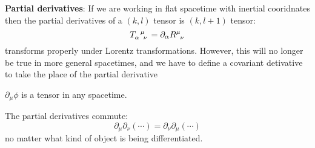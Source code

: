 \textbf{Partial derivatives}: If we are working in flat spacetime with inertial cooridnates then the partial derivatives of a $(k,l)$ tensor is $(k,l+1)$ tensor:
\begin{equation*}
    \tensor{T}{_\alpha^\mu_\nu}=\partial_\alpha \tensor{R}{^\mu_\nu}
\end{equation*}
transforms properly under Lorentz transformations. However, this will no longer be true in more general spacetimes, and we have to define a covariant detivative to take the place of the partial derivative

$\partial_\mu\phi$ is a tensor in any spacetime.

The partial derivatives commute:
\begin{equation*}
    \partial_\mu\partial_\nu(\cdots)=\partial_\nu\partial_\mu(\cdots)
\end{equation*}
no matter what kind of object is being differentiated.

